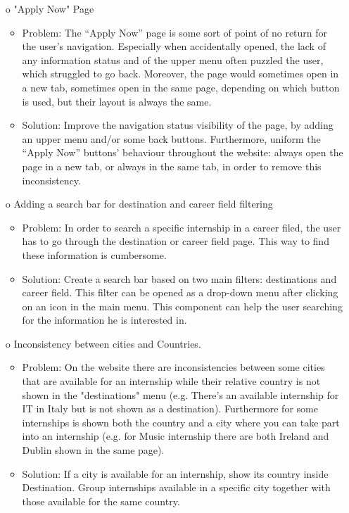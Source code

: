 \documentclass[11pt, letterpaper]{article}
\begin{document}
\begin{enumerate}
\begin{itemize}
        \end{itemize}
    \item[o] "Apply Now" Page
        \begin{itemize}
            \item Problem: The “Apply Now” page is some sort of point of no return for the user’s navigation. Especially when accidentally opened, the lack of any information status and of the upper menu often puzzled the user, which struggled to go back. Moreover, the page would sometimes open in a new tab, sometimes open in the same page, depending on which button is used, but their layout is always the same.
            \item Solution: Improve the navigation status visibility of the page, by adding an upper menu and/or some back buttons. Furthermore, uniform the “Apply Now” buttons’ behaviour throughout the website: always open the page in a new tab, or always in the same tab, in order to remove this inconsistency.
        \end{itemize}
    \item[o] Adding a search bar for destination and career field filtering
        \begin{itemize}
            \item Problem: In order to search a specific internship in a career filed, the user has to go through the destination or career field page. This way to find these information is cumbersome.
            \item Solution: Create a search bar based on two main filters: destinations and career field. This filter can be opened as a drop-down menu after clicking on an icon in the main menu. This component can help the user searching for the information he is interested in.
        \end{itemize}
    \item[o] Inconsistency between cities and Countries.
        \begin{itemize}
            \item Problem: On the website there are inconsistencies between some cities that are available for an internship while their relative country is not shown in the "destinations" menu (e.g. There's an available internship for IT in Italy but is not shown as a destination).
            Furthermore for some internships is shown both the country and a city where you can take part into an internship (e.g. for Music internship there are both Ireland and Dublin shown in the same page).
            \item Solution: If a city is available for an internship, show its country inside Destination. Group internships available in a specific city together with those available for the same country.

\end{itemize}
\end{enumerate}
\end{document}
